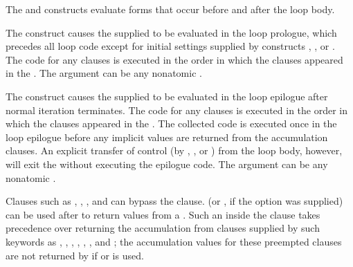  
 
The  and  constructs
evaluate forms that occur before and after the loop body.

The  construct causes the supplied  to be evaluated
in the loop prologue, which precedes all loop code except for 
initial settings supplied by constructs , , or
.
  The code for any  clauses is 
executed
in the order in which the clauses appeared in
  the .  
The  argument can be any nonatomic .
  
The  construct causes the supplied   to be evaluated
in the loop epilogue after normal iteration terminates.
  The code for any  clauses is 
executed
 in the order in which the clauses appeared in
  the .  The collected code is executed once in the loop epilogue
  before any implicit values are returned from the accumulation clauses.
An explicit transfer of control (\eg by , , or )
from the loop body, however, will exit the 
   without executing the epilogue code.
 The  argument can be any nonatomic .
 
Clauses such as , , , and 
can bypass the  clause.
 (or , if the  option was supplied)
can be used after  to return values from a .  
Such an 
inside the
 clause takes precedence over returning the accumulation
from clauses supplied by such keywords as , , 
, , , , and 
; 
the accumulation values for these preempted clauses are not returned by 
 if  or  is used.
 
